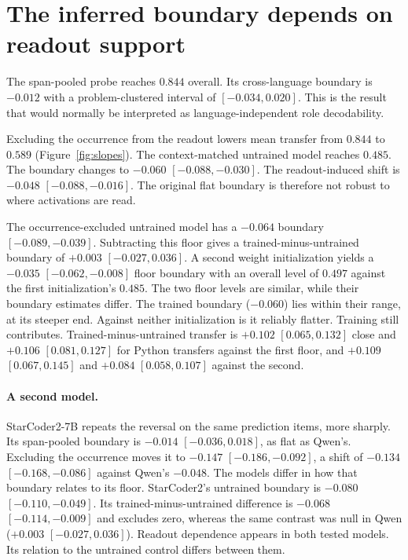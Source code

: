 \documentclass{article}
\begin{document}
\section{The inferred boundary depends on readout support}

The span-pooled probe reaches $0.844$ overall. Its cross-language boundary is
$-0.012$ with a problem-clustered interval of $[-0.034,0.020]$. This is the
result that would normally be interpreted as language-independent role
decodability.

Excluding the occurrence from the readout lowers mean transfer from $0.844$ to
$0.589$ (Figure~\ref{fig:slopes}). The context-matched untrained model reaches
$0.485$. The boundary changes to $-0.060$ $[-0.088,-0.030]$. The
readout-induced shift is $-0.048$ $[-0.088,-0.016]$. The original flat
boundary is therefore not robust to where activations are read.

The occurrence-excluded untrained model has a $-0.064$ boundary
$[-0.089,-0.039]$. Subtracting this floor gives a trained-minus-untrained
boundary of $+0.003$ $[-0.027,0.036]$. A second weight initialization yields a
$-0.035$ $[-0.062,-0.008]$ floor boundary with an overall level of $0.497$
against the first initialization's $0.485$. The two floor levels are similar,
while their boundary estimates differ. The trained boundary ($-0.060$) lies
within their range, at its steeper end. Against neither initialization is it
reliably flatter.
Training still contributes. Trained-minus-untrained transfer is $+0.102$
$[0.065,0.132]$ close and $+0.106$ $[0.081,0.127]$ for Python transfers
against the first floor, and $+0.109$ $[0.067,0.145]$ and $+0.084$
$[0.058,0.107]$ against the second.

\paragraph{A second model.} StarCoder2-7B repeats the reversal on the same
prediction items, more sharply. Its span-pooled boundary is $-0.014$
$[-0.036,0.018]$, as flat as Qwen's. Excluding the occurrence moves it to
$-0.147$ $[-0.186,-0.092]$, a shift of $-0.134$ $[-0.168,-0.086]$ against
Qwen's $-0.048$. The models differ in how that boundary relates to its floor.
StarCoder2's untrained boundary is $-0.080$ $[-0.110,-0.049]$. Its
trained-minus-untrained difference is $-0.068$ $[-0.114,-0.009]$ and excludes
zero, whereas the same contrast was null in Qwen ($+0.003$
$[-0.027,0.036]$). Readout dependence appears in both tested models. Its
relation to the untrained control differs between them.
\end{document}
